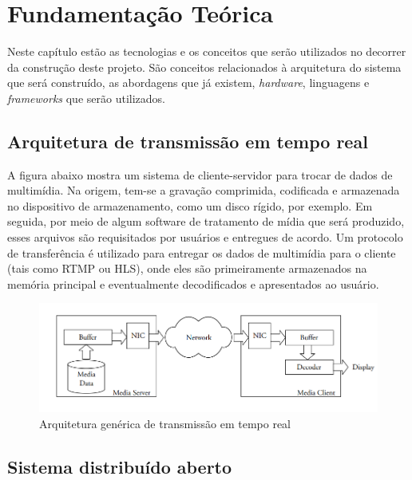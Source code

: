 \documentclass[12pt, %
openright, 
oneside, %
a4paper,    %
brazil]{facom-ufu-abntex2}
\begin{document}


\chapter{Fundamentação Teórica}

Neste capítulo estão as tecnologias e os conceitos que serão utilizados no
decorrer da construção deste projeto. São conceitos relacionados à arquitetura
do sistema que será construído, as abordagens que já existem, \emph{hardware},
linguagens e \emph{frameworks} que serão utilizados.

\section{Arquitetura de transmissão em tempo real}

A figura abaixo mostra um sistema de cliente-servidor para trocar de dados de
multimídia. Na origem, tem-se a gravação comprimida, codificada e armazenada no
dispositivo de armazenamento, como um disco rígido, por exemplo. Em seguida,
por meio de algum software de tratamento de mídia que será produzido, esses
arquivos são requisitados por usuários e entregues de acordo. Um protocolo de
transferência é utilizado para entregar os dados de multimídia para o cliente
(tais como RTMP ou HLS), onde eles são primeiramente armazenados na memória
principal e eventualmente decodificados e apresentados ao usuário.
\cite{lee2005scalable}

\begin{figure}[!ht]
	\centering
	\includegraphics[width=1\linewidth]{Capturar.PNG}
	\caption[Representação de um arquitetura de tempo real genérica]{Arquitetura genérica de transmissão em tempo real}
	\label{fig:graficosVariandoTamanhoRede}
\end{figure}

\section{Sistema distribuído aberto}
\end{document}
